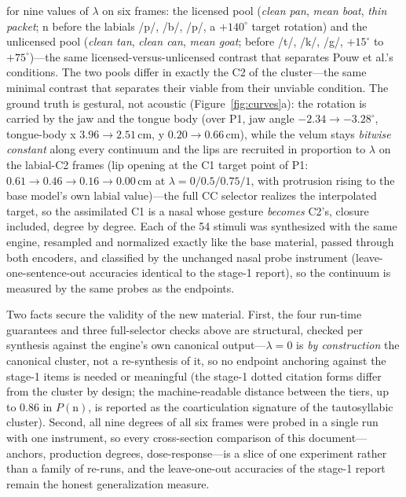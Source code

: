 \documentclass[11pt,a4paper]{article}
\newcommand{\lam}{\lambda}
\begin{document}
for nine values of $\lam$ on six frames: the licensed pool
(\emph{clean pan}, \emph{mean boat}, \emph{thin packet}; n before the
labials /p/, /b/, /p/, a $+140^{\circ}$ target rotation) and the
unlicensed pool (\emph{clean tan}, \emph{clean can}, \emph{mean
goat}; before /t/, /k/, /g/, $+15^{\circ}$ to $+75^{\circ}$)---the
same licensed-versus-unlicensed contrast that separates Pouw et al.'s
conditions. The two pools differ in exactly the C2 of the
cluster---the same minimal contrast that separates their viable from
their unviable condition. The ground truth is gestural, not acoustic
(Figure~\ref{fig:curves}a): the rotation is carried by the jaw and
the tongue body (over P1, jaw angle $-2.34 \to -3.28^{\circ}$,
tongue-body x $3.96 \to 2.51$\,cm, y $0.20 \to 0.66$\,cm), while the
velum stays \emph{bitwise constant} along every continuum and the
lips are recruited in proportion to $\lam$ on the labial-C2 frames
(lip opening at the C1 target point of P1: $0.61 \to 0.46 \to 0.16
\to 0.00$\,cm at $\lam = 0/0.5/0.75/1$, with protrusion rising to
the base model's own labial value)---the full CC selector realizes
the interpolated target, so the assimilated C1 is a nasal whose
gesture \emph{becomes} C2's, closure included, degree by degree.
Each of the 54 stimuli was synthesized with the same engine,
resampled and normalized exactly like the base material, passed
through both encoders, and classified by the unchanged nasal probe
instrument (leave-one-sentence-out accuracies identical to the
stage-1 report), so the continuum is measured by the same probes as
the endpoints.

Two facts secure the validity of the new material. First, the four
run-time guarantees and three full-selector checks above are
structural, checked per synthesis
against the engine's own canonical output---$\lam=0$ is \emph{by
construction} the canonical cluster, not a re-synthesis of it, so no
endpoint anchoring against the stage-1 items is needed or meaningful
(the stage-1 dotted citation forms differ from the cluster by design;
the machine-readable distance between the tiers, up to $0.86$ in
$P(\mathrm{n})$, is reported as the coarticulation signature of the
tautosyllabic cluster). Second, all nine degrees of all six frames
were probed in a single run with one instrument, so every
cross-section comparison of this document---anchors, production
degrees, dose-response---is a slice of one experiment rather than a
family of re-runs, and the leave-one-out accuracies of the stage-1
report remain the honest generalization measure.
\end{document}
